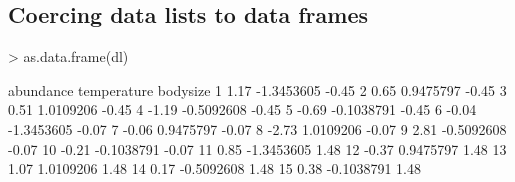 \documentclass{beamer}
\numberwithin{exercise}{section}
\begin{document}
%

\subsection[Coercion]{Coercing data lists to data frames}

\begin{frame}[fragile]
\begin{Schunk}
\begin{Sinput}
> as.data.frame(dl)
\end{Sinput}
\begin{Soutput}
   abundance temperature bodysize
1       1.17  -1.3453605    -0.45
2       0.65   0.9475797    -0.45
3       0.51   1.0109206    -0.45
4      -1.19  -0.5092608    -0.45
5      -0.69  -0.1038791    -0.45
6      -0.04  -1.3453605    -0.07
7      -0.06   0.9475797    -0.07
8      -2.73   1.0109206    -0.07
9       2.81  -0.5092608    -0.07
10     -0.21  -0.1038791    -0.07
11      0.85  -1.3453605     1.48
12     -0.37   0.9475797     1.48
13      1.07   1.0109206     1.48
14      0.17  -0.5092608     1.48
15      0.38  -0.1038791     1.48
\end{Soutput}
\end{Schunk}
\end{frame}
\end{document}
